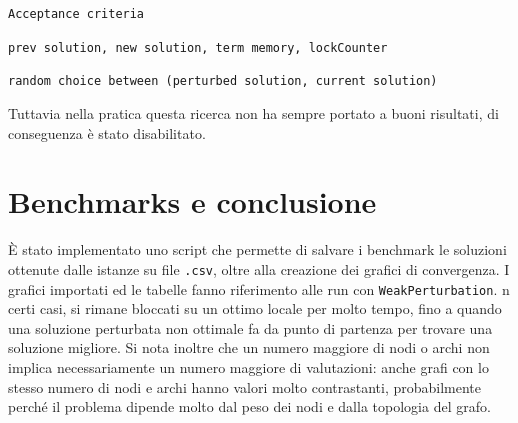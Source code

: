\documentclass[11pt]{article}
\begin{document}
\begin{algorithm}
\caption{\texttt{Acceptance criteria}}
\begin{algorithmic}
    \Require \texttt{prev solution, new solution, term memory, lockCounter}

    \EndIf{}
    
    \State \Return \texttt{random choice between (perturbed solution, current solution)}
\end{algorithmic}
\end{algorithm}

Tuttavia nella pratica questa ricerca non ha sempre portato a buoni risultati, di conseguenza è stato disabilitato.

\pagebreak

\section{Benchmarks e conclusione}

È stato implementato uno script che permette di salvare i benchmark le soluzioni ottenute dalle istanze su  file \verb|.csv|, oltre alla creazione dei grafici di convergenza.
I grafici importati ed le tabelle fanno riferimento alle run con \verb|WeakPerturbation|. n certi casi, si rimane bloccati su un ottimo locale per molto tempo, fino a quando una soluzione perturbata non ottimale fa da punto di partenza per trovare una soluzione migliore.
Si nota inoltre che un numero maggiore di nodi o archi non implica necessariamente un numero maggiore di valutazioni: anche grafi con lo stesso numero di nodi e archi hanno valori molto contrastanti, probabilmente perché il problema dipende molto dal peso dei nodi e dalla topologia del grafo.
\end{document}
